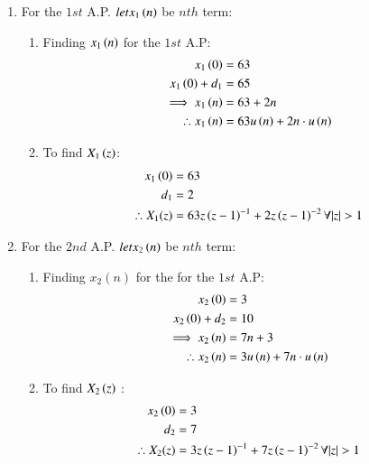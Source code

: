\documentclass[journal,12pt,twocolumn]{IEEEtran}
\theoremstyle{remark}
\begin{document}
\begin{enumerate}
\item
For the $ 1{st}$ A.P. $ let x_1\left(n\right)$  be $ nth$ term: 
\begin{enumerate}
\item
Finding $ x_1\left(n\right)$ for the $ 1{st}$ A.P:
\begin{align}
x_1\left(0\right) &= 63\\
x_1\left(0\right)+d_1 &= 65\\
\implies x_1\left(n\right) &= 63 + 2n \label{eq:3}\\
\therefore x_1\left(n\right) &= 63u\left(n\right) + 2n\cdot u\left(n\right)
\end{align}
\item
To find $ X_1\left(z\right)$:
\begin{align}
x_1\brak{0}&=63\\
d_1 &= 2\\
\therefore X_1(z) &= 63z\brak{z-1}^{-1} + 2z\brak{z-1}^{-2}  \forall  |z|>1
\end{align}
\end{enumerate}
\item
For the $ 2{nd}$ A.P.  $ let x_2\left(n\right)$  be $ nth$ term:\\
\begin{enumerate}
\item 
Finding $ x_2(n)$ for the for the $ 1{st}$ A.P:
\begin{align}
x_2\left(0\right) &= 3 \\
x_2\left(0\right)+d_2 &= 10\\
\implies x_2\left(n\right) &= 7n + 3 \label{eq:4}\\
\therefore x_2\left(n\right) &= 3u\left(n\right) + 7n\cdot u\left(n\right) \label{eq:4}
\end{align}
\item
To find $ X_2\left(z\right)$ :\\
\begin{align}
x_2\brak{0}&=3\\
d_2 &= 7\\
\therefore X_2(z) &= 3z\brak{z-1}^{-1} + 7z\brak{z-1}^{-2}  \forall  |z|>1
\end{align}


\end{enumerate}
\end{enumerate}
\end{document}
